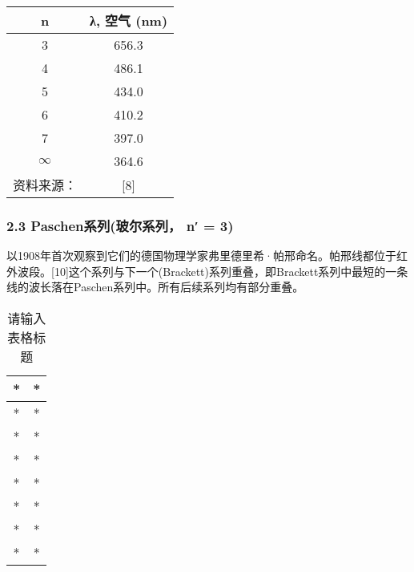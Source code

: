 \begin{table}[ht]
\centering
\caption{ }\label{tab_QYZGP2}
\begin{tabular}{|c|c|}
\hline
n & λ, 空气
(nm) \\
\hline
3 & 656.3 \\
\hline
4 &486.1\\
\hline
5 & 434.0 \\
\hline
6 & 410.2\\
\hline
7 & 397.0 \\
\hline
$\infty$ & 364.6 \\
\hline
资料来源： &[8] \\
\hline
\end{tabular}
\end{table}
\subsubsection{2.3 Paschen系列(玻尔系列， n′ = 3)}
以1908年首次观察到它们的德国物理学家弗里德里希·帕邢命名。帕邢线都位于红外波段。[10]这个系列与下一个(Brackett)系列重叠，即Brackett系列中最短的一条线的波长落在Paschen系列中。所有后续系列均有部分重叠。

\begin{table}[ht]
\centering
\caption{请输入表格标题}\label{tab_QYZGP3}
\begin{tabular}{|c|c|}
\hline
* & * \\
\hline
* & * \\
\hline
* & * \\
\hline
* & * \\
\hline
* & * \\
\hline
* & * \\
\hline
* & * \\
\hline
* & * \\
\hline
\end{tabular}
\end{table}
